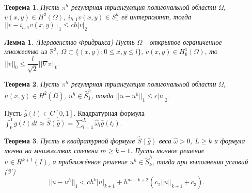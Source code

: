 \documentclass{article}
\newtheorem{theorem}{Теорема}
\newtheorem{lemma}{Лемма}
\begin{document}
\begin{theorem}
	Пусть $\pi^h$ регулярная триангуляция полигональной области $\Omega$, $v(x,y) \in H^2(\Omega)$, $ i_{h,1} v(x,y) \in S_1^h$ её интерполянт, тогда $||v -i_{h,1} v(x,y)||_1 \leqslant ch |v|_2 $
\end{theorem}

\begin{lemma}
	(Неравенство Фридрихса) Пусть $\Omega$ - открытое ограниченное множество из $\mathbb{R}^2$, $\Omega \subset \{(x,y): 0\leqslant x,y \leqslant l\}$, $v(x,y) \in H_0^1(\Omega)$, то $||v||_0 \leqslant \dfrac{l}{\sqrt{2}} || \nabla v||_0$.
\end{lemma}

\begin{theorem}
	Пусть $\pi^h$ регулярная триангуляция полигональной области $\Omega$, $u(x,y) \in H^2(\overline{\Omega})$, $ u^h \in \overset{\circ}{S}_1^h$, тогда $||u - u^h||_1 \leqslant c |u|_2$.
\end{theorem}

Пусть $\hat{g}(t) \in C[0,1]$. Квадратурная формула $\int_0^1 \hat{g}(t) dt \approx \hat{S}(\hat{g}) = \sum_{l = 1}^{L} \hat{\omega}_l \hat{g}(t_l)$.

\begin{theorem}
	Пусть в квадратурной формуле $\hat{S}(\hat{g})$ веса $\hat{\omega} > 0$, $L \geqslant k$ и формула точна на множествах степени $m \geqslant k - 1$. Пусть точное решение $u \in H^{k+1}(I)$, а приближённое решение $u^h \in \tilde{S}_k^h$, тогда при выполнении условий (3')
	\[
	|| u - u^h||_1 < ch^k |u|_{k+1} + h^{m-k+2}(c_2 ||u||_{k+1} + c_3).	
	\]
\end{theorem}
\end{document}
